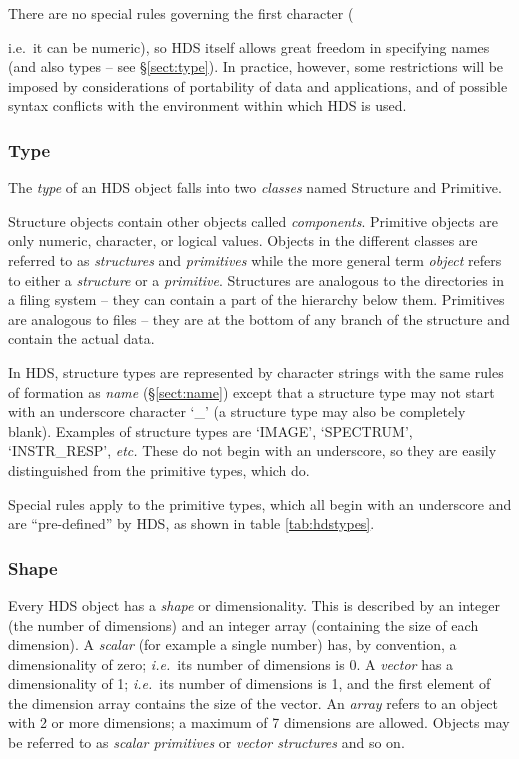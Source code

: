 \documentclass[final,authoryear,5p,times,twocolumn]{elsarticle}
\begin{document}
There are no special rules governing the first character
({i.e.\ it can be numeric), so HDS itself allows great freedom in specifying
names (and also types -- see \S\ref{sect:type}). In practice,
however, some restrictions will be imposed by considerations of
portability of data and applications, and of possible syntax conflicts
with the environment within which HDS is used.

\subsubsection{\label{sect:type}Type}

The \emph{type} of an HDS object falls into two \emph{classes} named
Structure and Primitive.

Structure objects contain other objects called
\emph{components}. Primitive objects are only numeric, character,
or logical values. Objects in the different classes are referred to as
\emph{structures} and \emph{primitives} while the more general term
\emph{object} refers to either a \emph{structure} or a
\emph{primitive}. Structures are analogous to the directories in a
filing system -- they can contain a part of the hierarchy below
them. Primitives are analogous to files -- they are at the bottom of
any branch of the structure and contain the actual data.

In HDS, structure types are represented by character strings with the
same rules of formation as \emph{name} (\S\ref{sect:name}) except that
a structure type may not start with an underscore character `\_' (a
structure type may also be completely blank). Examples of structure
types are `IMAGE', `SPECTRUM', `INSTR\_RESP', \emph{etc.} These do not
begin with an underscore, so they are easily distinguished from the
primitive types, which do.

Special rules apply to the primitive types, which all begin with an
underscore and are ``pre-defined'' by HDS, as shown in table
\ref{tab:hdstypes}.

\subsubsection{\label{sect:shape}Shape}

Every HDS object has a \emph{shape} or dimensionality. This is
described by an integer (the number of dimensions) and an integer
array (containing the size of each dimension). A \emph{scalar} (for
example a single number) has, by convention, a dimensionality of zero;
\emph{i.e.}\ its number of dimensions is 0. A \emph{vector} has a
dimensionality of 1; \emph{i.e.}\ its number of dimensions is 1, and
the first element of the dimension array contains the size of the
vector.  An \emph{array} refers to an object with 2 or more dimensions;
a maximum of 7 dimensions are allowed. Objects may be referred to as
\emph{scalar primitives} or \emph{vector structures} and so on.

}
\end{document}
